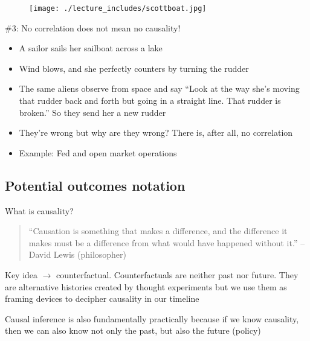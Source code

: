 \documentclass{beamer}
\begin{document}
\begin{frame}[plain]

  \begin{figure}
    \centering
    \texttt{[image: ./lecture\_includes/scottboat.jpg]}
  \end{figure}

\end{frame}

\begin{frame}{\#3: No correlation does not mean no causality!}

  \begin{itemize}
    \item A sailor sails her sailboat across a lake
    \item Wind blows, and she perfectly counters by turning the rudder
    \item The same aliens observe from space and say ``Look at the way she's moving that rudder back and forth but going in a straight line.  That rudder is broken.'' So they send her a new rudder
    \item They're wrong but why are they wrong? There is, after all, no correlation
    \item Example: Fed and open market operations
  \end{itemize}

\end{frame}

\subsection{Potential outcomes notation}

\begin{frame}{What is causality?}

  \begin{quote}
    ``Causation is something that makes a difference, and the difference it makes must be a difference from what would have happened without it.'' -- David Lewis (philosopher)
  \end{quote}

  \bigskip
  Key idea $\rightarrow$ counterfactual. Counterfactuals are neither past nor future.  They are alternative histories created by thought experiments but we use them as framing devices to decipher causality in our timeline

  \bigskip

  Causal inference is also fundamentally practically because if we know causality, then we can also know not only the past, but also the future (policy)

\end{frame}
\end{document}
